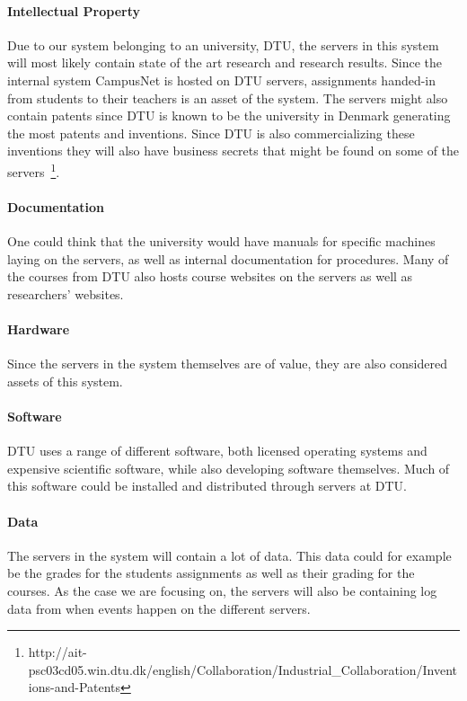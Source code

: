 \paragraph{Intellectual Property}
Due to our system belonging to an university, DTU, the servers in this system will most likely contain state of the art research and research results. Since the internal system CampusNet is hosted on DTU servers, assignments handed-in from students to their teachers is an asset of the system. The servers might also contain patents since DTU is known to be the university in Denmark generating the most patents and inventions. Since DTU is also commercializing these inventions they will also have business secrets that might be found on some of the servers~\footnote{http://ait-psc03cd05.win.dtu.dk/english/Collaboration/Industrial\_Collaboration/Inventions-and-Patents}.

\paragraph{Documentation}
One could think that the university would have manuals for specific machines laying on the servers, as well as internal documentation for procedures. Many of the courses from DTU also hosts course websites on the servers as well as researchers' websites.

\paragraph{Hardware}
Since the servers in the system themselves are of value, they are also considered assets of this system.

\paragraph{Software}
DTU uses a range of different software, both licensed operating systems and expensive scientific software, while also developing software themselves. Much of this software could be installed and distributed through servers at DTU.

\paragraph{Data}
The servers in the system will contain a lot of data. This data could for example be the grades for the students assignments as well as their grading for the courses. As the case we are focusing on, the servers will also be containing log data from when events happen on the different servers.

